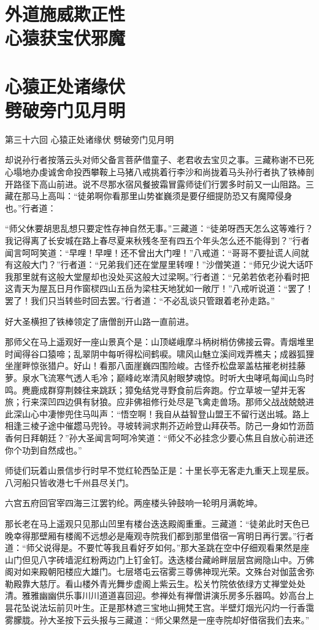\documentclass[12pt,UTF8]{ctexbook}
\begin{document}
{\chapter[外道施威欺正性\ 心猿获宝伏邪魔]{外道施威欺正性\\心猿获宝伏邪魔}
\chapter[心猿正处诸缘伏\ 劈破旁门见月明]{心猿正处诸缘伏\\劈破旁门见月明}

第三十六回 心猿正处诸缘伏 劈破旁门见月明

却说孙行者按落云头对师父备言菩萨借童子、老君收去宝贝之事。三藏称谢不已死心塌地办虔诚舍命投西攀鞍上马猪八戒挑着行李沙和尚拢着马头孙行者执了铁棒剖开路径下高山前进。说不尽那水宿风餐披霜冒露师徒们行罢多时前又一山阻路。三藏在那马上高叫：“徒弟啊你看那里山势崔巍须是要仔细提防恐又有魔障侵身也。”行者道：

“师父休要胡思乱想只要定性存神自然无事。”三藏道：“徒弟呀西天怎么这等难行？我记得离了长安城在路上春尽夏来秋残冬至有四五个年头怎么还不能得到？”行者闻言呵呵笑道：“早哩！早哩！还不曾出大门哩！”八戒道：“哥哥不要扯谎人间就有这般大门？”行者道：“兄弟我们还在堂屋里转哩！”沙僧笑道：“师兄少说大话吓我那里就有这般大堂屋却也没处买这般大过梁啊。”行者道：“兄弟若依老孙看时把这青天为屋瓦日月作窗棂四山五岳为梁柱天地犹如一敞厅！”八戒听说道：“罢了！罢了！我们只当转些时回去罢。”行者道：“不必乱谈只管跟着老孙走路。”

好大圣横担了铁棒领定了唐僧剖开山路一直前进。

那师父在马上遥观好一座山景真个是：山顶嵯峨摩斗柄树梢仿佛接云霄。青烟堆里时闻得谷口猿啼；乱翠阴中每听得松间鹤唳。啸风山魅立溪间戏弄樵夫；成器狐狸坐崖畔惊张猎户。好山！看那八面崖巍四围险峻。古怪乔松盘翠盖枯摧老树挂藤萝。泉水飞流寒气透人毛冷；巅峰屹崒清风射眼梦魂惊。时听大虫哮吼每闻山鸟时鸣。麂鹿成群穿荆棘往来跳跃；獐兔结党寻野食前后奔跑。佇立草坡一望并无客旅；行来深凹四边俱有豺狼。应非佛祖修行处尽是飞禽走兽场。那师父战战兢兢进此深山心中凄惨兜住马叫声：“悟空啊！我自从益智登山盟王不留行送出城。路上相逢三棱子途中催趱马兜铃。寻坡转涧求荆芥迈岭登山拜茯苓。防己一身如竹沥茴香何日拜朝廷？”孙大圣闻言呵呵冷笑道：“师父不必挂念少要心焦且自放心前进还你个功到自然成也。”

师徒们玩着山景信步行时早不觉红轮西坠正是：十里长亭无客走九重天上现星辰。八河船只皆收港七千州县尽关门。

六宫五府回官宰四海三江罢钓纶。两座楼头钟鼓响一轮明月满乾坤。

那长老在马上遥观只见那山凹里有楼台迭迭殿阁重重。三藏道：“徒弟此时天色已晚幸得那壁厢有楼阁不远想必是庵观寺院我们都到那里借宿一宵明日再行罢。”行者道：“师父说得是。不要忙等我且看好歹如何。”那大圣跳在空中仔细观看果然是座山门但见八字砖墙泥红粉两边门上钉金钉。迭迭楼台藏岭畔层层宫阙隐山中。万佛阁对如来殿朝阳楼应大雄门。七层塔屯云宿雾三尊佛神现光荣。文殊台对伽蓝舍弥勒殿靠大慈厅。看山楼外青光舞步虚阁上紫云生。松关竹院依依绿方丈禅堂处处清。雅雅幽幽供乐事川川道道喜回迎。参禅处有禅僧讲演乐房多乐器鸣。妙高台上昙花坠说法坛前贝叶生。正是那林遮三宝地山拥梵王宫。半壁灯烟光闪灼一行香霭雾朦胧。孙大圣按下云头报与三藏道：“师父果然是一座寺院却好借宿我们去来。”

}
\end{document}
